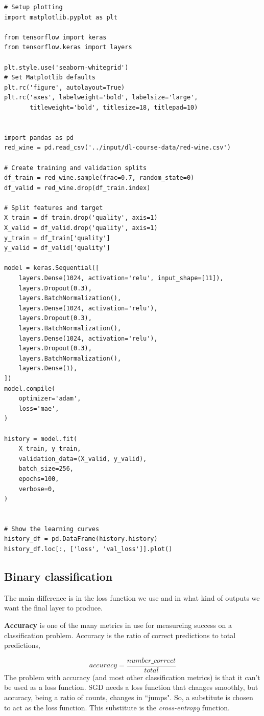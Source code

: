 \begin{lstlisting}
# Setup plotting
import matplotlib.pyplot as plt

from tensorflow import keras
from tensorflow.keras import layers

plt.style.use('seaborn-whitegrid')
# Set Matplotlib defaults
plt.rc('figure', autolayout=True)
plt.rc('axes', labelweight='bold', labelsize='large',
       titleweight='bold', titlesize=18, titlepad=10)


import pandas as pd
red_wine = pd.read_csv('../input/dl-course-data/red-wine.csv')

# Create training and validation splits
df_train = red_wine.sample(frac=0.7, random_state=0)
df_valid = red_wine.drop(df_train.index)

# Split features and target
X_train = df_train.drop('quality', axis=1)
X_valid = df_valid.drop('quality', axis=1)
y_train = df_train['quality']
y_valid = df_valid['quality']

model = keras.Sequential([
    layers.Dense(1024, activation='relu', input_shape=[11]),
    layers.Dropout(0.3),
    layers.BatchNormalization(),
    layers.Dense(1024, activation='relu'),
    layers.Dropout(0.3),
    layers.BatchNormalization(),
    layers.Dense(1024, activation='relu'),
    layers.Dropout(0.3),
    layers.BatchNormalization(),
    layers.Dense(1),
])
model.compile(
    optimizer='adam',
    loss='mae',
)

history = model.fit(
    X_train, y_train,
    validation_data=(X_valid, y_valid),
    batch_size=256,
    epochs=100,
    verbose=0,
)


# Show the learning curves
history_df = pd.DataFrame(history.history)
history_df.loc[:, ['loss', 'val_loss']].plot()
\end{lstlisting}

\subsection{Binary classification}
\noindent The main difference is in the loss function we use and in what kind of outputs we
want the final layer to produce.

\noindent \textbf{Accuracy} is one of the many metrics in use for measureing success on a
classification problem. Accuracy is the ratio of correct predictions to total predictions,

\begin{equation}
	accuracy = \frac{number\_correct}{total}
	\label{eq:1}
\end{equation}
\noindent The problem with accuracy (and most other classification metrics) is that it can't
be used as a loss function. SGD needs a loss function that changes smoothly, but accuracy,
being a ratio of counts, changes in ``jumps". So, a substitute is chosen to act as the loss
function. This substitute is the \emph{cross-entropy} function.

